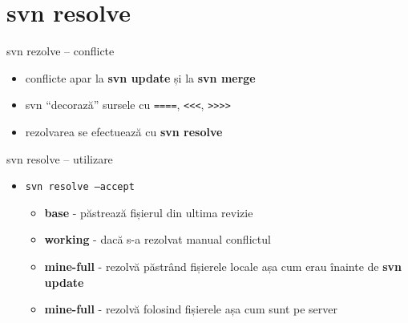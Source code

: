 \documentclass{beamer}
\begin{document}
\section{svn resolve}
\frame{\tableofcontents[currentsection]}

\begin{frame}{svn rezolve – conflicte}
  \begin{itemize}[<+->]
    \item conflicte apar la \textbf{svn update} și la \textbf{svn merge}
    \item svn ``decorază'' sursele cu \texttt{====}, \texttt{<<<}, \texttt{>>>>}
    \item rezolvarea se efectuează cu \textbf{svn resolve}
  \end{itemize}
\end{frame}


\begin{frame}{svn resolve – utilizare}
  \begin{itemize}[<+->]
    \item \texttt{svn resolve --accept}
      \begin{itemize}[<+->]
      \item \textbf{base} - păstrează fișierul din ultima revizie
      \item \textbf{working} - dacă s-a rezolvat manual conflictul
      \item \textbf{mine-full} - rezolvă păstrând fișierele locale așa cum erau înainte de \textbf{svn update}
      \item \textbf{mine-full} - rezolvă folosind fișierele așa cum sunt pe server
      \end{itemize}
  \end{itemize}
\end{frame}
\end{document}
